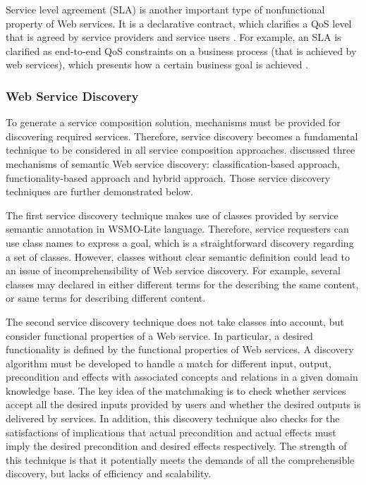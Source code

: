 Service level agreement (SLA) is another important type of nonfunctional property of Web services. It is a declarative contract, which clarifies a QoS level that is agreed by service providers and service users \cite{zhao2015toward}. For example,  an SLA is clarified as end-to-end QoS constraints on a business process (that is achieved by web services),  which presents how a certain business goal is achieved \cite{wada2008multiobjective}.

\subsubsection{Web Service Discovery}\label{servicediscovery}
To generate a service composition solution, mechanisms must be provided for discovering required services. Therefore, service discovery becomes a fundamental technique to be considered in all service composition approaches. \cite{agarwal2009d5} discussed three mechanisms of semantic Web service discovery: classification-based approach, functionality-based approach and hybrid approach. Those service discovery techniques are further demonstrated below.

The first service discovery technique makes use of classes provided by service semantic annotation in WSMO-Lite language. Therefore, service requesters can use class names to express a goal, which is a straightforward discovery regarding a set of classes. However, classes without clear semantic definition could lead to an issue of incomprehensibility of Web service discovery. For example, several classes may declared in either different terms for the describing the same content, or same terms for describing different content.

The second service discovery technique  does not take classes into account, but consider functional properties of a Web service. In particular, a desired functionality is defined by the functional properties of Web services. A discovery algorithm must be developed to handle a match for different input, output, precondition and effects with associated concepts and relations in a given domain knowledge base. The key idea of the matchmaking is to check whether services accept all the desired inputs provided by users and whether the desired outputs is delivered by services. In addition, this discovery technique also checks for the satisfactions of implications that actual precondition and actual effects must imply the desired precondition and desired effects respectively. The strength of this technique is that it potentially meets the demands of all the comprehensible discovery, but lacks of efficiency and scalability. 

